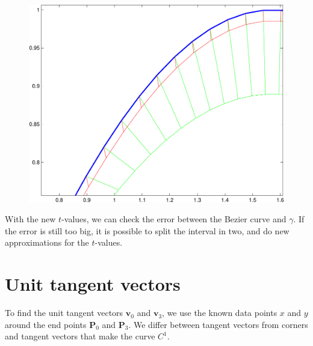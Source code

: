 \documentclass[10pt]{article}
\begin{document}
\begin{figure}
\centering
\begin{minipage}[t]{.4\textwidth}
\centering
\vspace{0pt}
    \includegraphics[scale=0.5]{newtons2-crop.pdf}
    \label{fig:Newton-Raphson}
\end{minipage}\hfill
\begin{minipage}[t]{.4\textwidth}
\centering
\vspace{0pt}
\end{minipage}
\end{figure}


With the new $t$-values, we can check the error between the Bezier curve and $\gamma$. If the error is still too big, it is possible to split the interval in two, and do new approximations for the $t$-values.



\section*{Unit tangent vectors}
To find the unit tangent vectors $\mathbf{v}_0$ and $\mathbf{v}_3$, we use the known data points $x$ and $y$ around the end points $\mathbf{P}_0$ and $\mathbf{P}_3$. We differ between tangent vectors from corners and tangent vectors that make the curve $C^1$.
\end{document}
